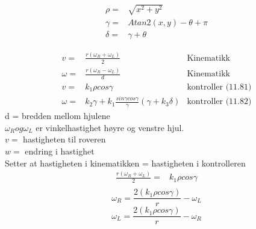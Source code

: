 

\begin{equation}
\begin{array}{ll}
\rho = &\sqrt{x^2+y^2}\\
\gamma = & Atan2(x,y)-\theta + \pi\\
\delta = & \gamma + \theta
\end{array}
\end{equation}

\begin{equation}
\begin{array}{llr}
v = & \frac{r(\omega_R + \omega_L)}{2} &\text{Kinematikk}\\
\omega = & \frac{r(\omega_R - \omega_L)}{d}&\text{Kinematikk}\\
v = &k_1 \rho cos\gamma& \text{kontroller (11.81)}\\
\omega = &k_2 \gamma + k_1 \frac{sin\gamma cos\gamma}{\gamma}(\gamma+k_3 \delta)& \text{kontroller (11.82)}
\end{array}
\end{equation}
d = bredden mellom hjulene\\ $\omega_R og \omega_L$ er vinkelhastighet høyre og venstre hjul. \\
$v = $ hastigheten til roveren\\
$w = $ endring i hastighet\\
Setter at hastigheten i kinematikken = hastigheten i kontrolleren
\begin{equation}
\begin{array}{rl}
\frac{r(\omega_R + \omega_L)}{2} = & k_1 \rho cos\gamma\\
\end{array}
\end{equation}
\begin{equation}
\omega_R = \frac{2(k_1 \rho cos\gamma)}{r} - \omega_L
\label{vwR}
\end{equation}
\begin{equation}
\omega_L = \frac{2(k_1 \rho cos\gamma)}{r} - \omega_R
\label{vwL}
\end{equation}

